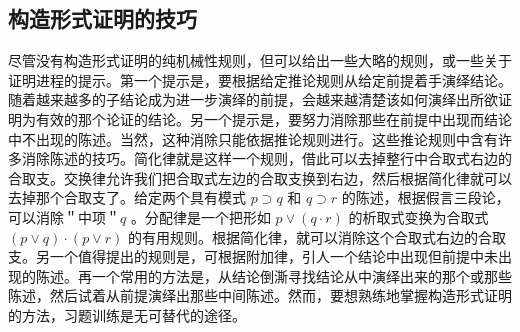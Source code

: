 \subsection{构造形式证明的技巧}

尽管没有构造形式证明的纯机械性规则，但可以给出一些大略的规则，或一些关于证明进程的提示。第一个提示是，要根据给定推论规则从给定前提着手演绎结论。随着越来越多的子结论成为进一步演绎的前提，会越来越清楚该如何演绎出所欲证明为有效的那个论证的结论。另一个提示是，要努力消除那些在前提中出现而结论中不出现的陈述。当然，这种消除只能依据推论规则进行。这些推论规则中含有许多消除陈述的技巧。简化律就是这样一个规则，借此可以去掉整行中合取式右边的合取支。交换律允许我们把合取式左边的合取支换到右边，然后根据简化律就可以去掉那个合取支了。给定两个具有模式 $p \supset q$ 和 $q \supset r$ 的陈述，根据假言三段论，可以消除＂中项＂$q$ 。分配律是一个把形如 $p \vee(q \cdot r)$ 的析取式变换为合取式 $(p \vee q) \cdot(p \vee r)$ 的有用规则。根据简化律，就可以消除这个合取式右边的合取支。另一个值得提出的规则是，可根据附加律，引人一个结论中出现但前提中未出现的陈述。再一个常用的方法是，从结论倒澌寻找结论从中演绎出来的那个或那些陈述，然后试着从前提演绎出那些中间陈述。然而，要想熟练地掌握构造形式证明的方法，习题训练是无可替代的途径。

